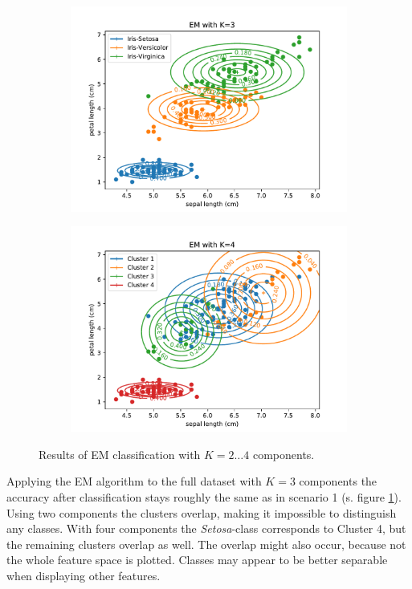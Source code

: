 \documentclass{article}
\begin{document}
\begin{figure}[!ht]
{\begin{subfigure}{0.6\textwidth}
	\includegraphics[width=\textwidth]{./Figures/2_2_EM_cont_K3}
	\end{subfigure}
	\begin{subfigure}{0.6\textwidth}
	\includegraphics[width=\textwidth]{./Figures/2_2_EM_cont_K4}
	\end{subfigure}
	}	
	\caption{Results of EM classification with $K=2\dots4$ components.}
	\label{2_2_EM_cont}
\end{figure}

Applying the EM algorithm to the full dataset with $K=3$ components the accuracy after classification stays roughly the same as in scenario 1 (s. figure \ref{2_2_EM_cont}). Using two components the clusters overlap, making it impossible to distinguish any classes. With four components the \textit{Setosa}-class corresponds to Cluster 4, but the remaining clusters overlap as well. The overlap might also occur, because not the whole feature space is plotted. Classes may appear to be better separable when displaying other features.
\end{document}
